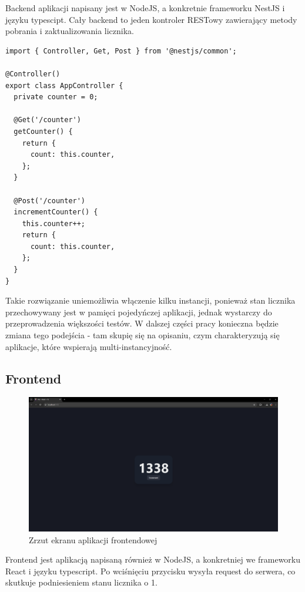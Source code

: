 \documentclass{article}
\begin{document}
Backend aplikacji napisany jest w NodeJS, a konkretnie frameworku NestJS i języku typescipt. Cały backend to jeden kontroler RESTowy zawierający metody pobrania i zaktualizowania licznika.

\begin{lstlisting}[caption=Główny kod backendu NestJS]
import { Controller, Get, Post } from '@nestjs/common';

@Controller()
export class AppController {
  private counter = 0;

  @Get('/counter')
  getCounter() {
    return {
      count: this.counter,
    };
  }

  @Post('/counter')
  incrementCounter() {
    this.counter++;
    return {
      count: this.counter,
    };
  }
}

\end{lstlisting}

Takie rozwiązanie uniemożliwia włączenie kilku instancji, ponieważ stan licznika przechowywany jest w pamięci pojedyńczej aplikacji, jednak wystarczy do przeprowadzenia większości testów. W dalszej części pracy konieczna będzie zmiana tego podejścia - tam skupię się na opisaniu, czym charakteryzują się aplikacje, które wspierają multi-instancyjność.

\subsection{Frontend}

\begin{figure}[H]
    \centering
    \includegraphics[width=1\linewidth]{frontendScreenshot.png}
    \caption{Zrzut ekranu aplikacji frontendowej}
\end{figure}

Frontend jest aplikacją napisaną również w NodeJS, a konkretniej we frameworku React i języku typescript. Po wciśnięciu przycisku wysyła request do serwera, co skutkuje podniesieniem stanu licznika o 1.
\end{document}

